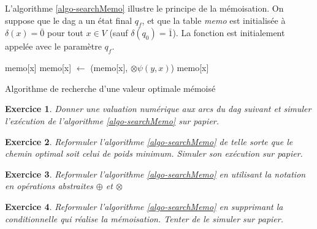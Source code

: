 \documentclass[11pt,openany]{book}
\newtheorem{exo}{Exercice}[chapter]
\newcommand{\ac}[1]{{\sc #1}} %
\begin{document}
L'algorithme \ref{algo-searchMemo} illustre le principe de la mémoisation. On suppose que le \ac{dag} a un état final $q_f$, et que la table {\sl memo} est initialisée à $\delta(x) = \bar{0}$ pour tout  $x\in V$ (sauf $\delta(q_0) = \bar{1}$). La fonction est initialement appelée avec le paramètre $q_f$.  

\begin{algorithm}[htbp]
\begin{algorithmic}[1]
\State\Return memo[x]
\EndIf
{}
\State memo[x] $\gets$ \Call{$\oplus$}{}(memo[x], $\otimes \psi(y,x)$)
\EndFor
\State\Return memo[x]
\EndFunction
\end{algorithmic}
\caption{\label{algo-searchMemo}Algorithme de recherche d'une valeur optimale mémoisé}
\end{algorithm}

\begin{exo}Donner une valuation numérique aux arcs du \ac{dag} suivant et  simuler l'exécution de l'algorithme \ref{algo-searchMemo} sur papier.
\begin{center}
\end{center}
\end{exo}
\begin{exo}
Reformuler l'algorithme \ref{algo-searchMemo} de telle sorte que le chemin optimal 
soit celui de poids minimum.  Simuler son exécution sur papier.
\end{exo}
\begin{exo}
Reformuler l'algorithme \ref{algo-searchMemo} en utilisant la notation en opérations abstraites $\oplus$ et $\otimes$
\end{exo}
\begin{exo}
Reformuler l'algorithme \ref{algo-searchMemo} en supprimant la conditionnelle qui réalise la mémoisation.  Tenter de le simuler sur papier.
\end{exo}
\end{document}

